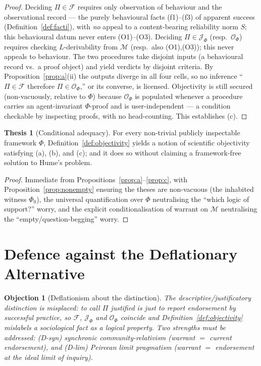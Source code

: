 \documentclass{amsart}
\theoremstyle{definition}
\newtheorem{thesis}{Thesis}
\theoremstyle{plain}
\newtheorem{objection}{Objection}
\theoremstyle{remark}
\begin{document}
\begin{proof}
Deciding $\Pi\in\mathcal{F}$ requires only observation of behaviour and the
observational record --- the purely behavioural facts (f1)--(f3) of apparent
success (Definition~\ref{def:facti}), with \emph{no} appeal to a content-bearing
reliability norm $S$; this behavioural datum never enters (O1)--(O3). Deciding $\Pi\in\mathcal{J}_\Phi$ (resp.\
$\mathcal{O}_\Phi$) requires checking $L$-derivability from $\mathcal{M}$
(resp.\ also (O1),(O3)); this never appeals to behaviour. The two procedures
take disjoint inputs (a behavioural record vs.\ a proof object) and yield
verdicts by disjoint criteria. By Proposition~\ref{prop:a}(ii) the outputs
diverge in all four cells, so no inference ``$\Pi\in\mathcal{F}$ therefore
$\Pi\in\mathcal{O}_\Phi$,'' or its converse, is licensed. Objectivity is still
secured (non-vacuously, relative to $\Phi$) because $\mathcal{O}_\Phi$ is
populated whenever a procedure carries an agent-invariant $\Phi$-proof and is
user-independent --- a condition checkable by inspecting proofs, with no
head-counting. This establishes (c).
\end{proof}

\begin{thesis}[Conditional adequacy]\label{thesis:adequacy}
For every non-trivial publicly inspectable framework $\Phi$,
Definition~\ref{def:objectivity} yields a notion of scientific objectivity
satisfying (a), (b), and (c); and it does so without claiming a framework-free
solution to Hume's problem.
\end{thesis}

\begin{proof}
Immediate from Propositions~\ref{prop:a}--\ref{prop:c}, with
Proposition~\ref{prop:nonempty} ensuring the theses are non-vacuous (the
inhabited witness $\Phi_0$), the universal quantification over $\Phi$
neutralising the ``which logic of support?'' worry, and the explicit
conditionalisation of warrant on $\mathcal{M}$ neutralising the
``empty/question-begging'' worry.
\end{proof}

\section{Defence against the Deflationary Alternative}

\begin{objection}[Deflationism about the distinction]\label{obj:deflation}
The descriptive/justificatory distinction is misplaced: to call $\Pi$ justified
is just to report endorsement by successful practice, so $\mathcal{F}$,
$\mathcal{J}_\Phi$ and $\mathcal{O}_\Phi$ coincide and
Definition~\ref{def:objectivity} mislabels a sociological fact as a logical
property. Two strengths must be addressed: \emph{(D-syn)} synchronic
community-relativism (warrant $=$ current endorsement), and \emph{(D-lim)}
Peircean limit pragmatism (warrant $=$ endorsement at the ideal limit of
inquiry).
\end{objection}
\end{document}
